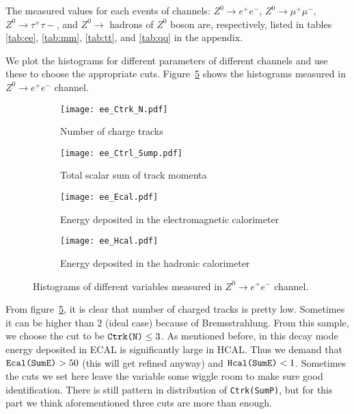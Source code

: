 The measured values for each events of channels: $ {Z}^0\rightarrow e^+e^- $, $ {Z}^0\rightarrow \mu^+\mu^- $, $ {Z}^0\rightarrow \tau^+\tau-$,  and $ {Z}^0\rightarrow  $ hadrons of $ Z^0 $ boson are, respectively, listed in tables \ref{tab:ee}, \ref{tab:mm}, \ref{tab:tt}, and \ref{tab:qq} in the appendix.

We plot the histograms for different parameters of different channels and use these to choose the appropriate cuts. Figure~\ref{Fig:histograms_ee} shows the histograms measured in $  {Z}^0\rightarrow e^+e^- $ channel.  
\begin{figure}[H]  
	\begin{subfigure}[t]{0.5\textwidth}
	\begin{center}
		\texttt{[image: ee\_Ctrk\_N.pdf]}
	\end{center}
	\caption{Number of charge tracks}
	\label{fig:}
	\end{subfigure}%
	\begin{subfigure}[t]{0.5\textwidth}
	\begin{center}
		\texttt{[image: ee\_Ctrl\_Sump.pdf]}
	\end{center}
	\caption{Total scalar sum of track momenta}
	\label{fig:}
	\end{subfigure}
	
	\begin{subfigure}[t]{0.5\textwidth}
	\begin{center}
		\texttt{[image: ee\_Ecal.pdf]}
	\end{center}
	\caption{Energy deposited in the electromagnetic calorimeter}
	\label{fig:}
	\end{subfigure}%
	\begin{subfigure}[t]{0.5\textwidth}
	\begin{center}
		\texttt{[image: ee\_Hcal.pdf]}
	\end{center}
	\caption{Energy deposited in the hadronic calorimeter}
	\label{fig:}
	\end{subfigure}
	\caption{Histograms of different variables measured in $  {Z}^0\rightarrow e^+e^- $ channel. }
\label{Fig:histograms_ee}	
\end{figure}
From figure~\ref{Fig:histograms_ee}, it is clear that number of charged tracks is pretty low. Sometimes it can be higher than $2$ (ideal case) because of Bremsstrahlung. From this sample, we choose the cut to be $\verb|Ctrk(N)| \leq 3$. As mentioned before, in this decay mode energy deposited in ECAL is significantly large in HCAL. Thus we demand that $\verb|Ecal(SumE)| > 50$ (this will get refined anyway) and $\verb|Hcal(SumE)| < 1$. Sometimes the cuts we set here leave the variable some wiggle room to make sure good identification. There is still pattern in distribution of \verb|Ctrk(SumP)|, but for this part we think aforementioned three cuts are more than enough.

